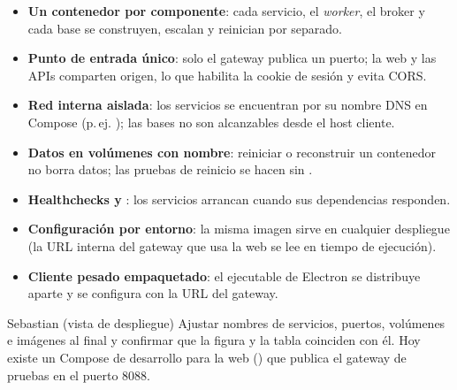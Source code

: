 \begin{itemize}
  \item \textbf{Un contenedor por componente}: cada servicio, el \textit{worker}, el broker y cada base se construyen, escalan y reinician por separado.
  \item \textbf{Punto de entrada único}: solo el gateway publica un puerto; la web y las APIs comparten origen, lo que habilita la cookie de sesión y evita CORS.
  \item \textbf{Red interna aislada}: los servicios se encuentran por su nombre DNS en Compose (p.\,ej. ); las bases no son alcanzables desde el host cliente.
  \item \textbf{Datos en volúmenes con nombre}: reiniciar o reconstruir un contenedor no borra datos; las pruebas de reinicio se hacen sin .
  \item \textbf{Healthchecks y }: los servicios arrancan cuando sus dependencias responden.
  \item \textbf{Configuración por entorno}: la misma imagen sirve en cualquier despliegue (la URL interna del gateway que usa la web se lee en tiempo de ejecución).
  \item \textbf{Cliente pesado empaquetado}: el ejecutable de Electron se distribuye aparte y se configura con la URL del gateway.
\end{itemize}

\begin{pendiente}{Sebastian (vista de despliegue)}
Ajustar nombres de servicios, puertos, volúmenes e imágenes al  final y
confirmar que la figura y la tabla coinciden con él. Hoy existe un Compose de desarrollo para la
web () que publica el gateway de pruebas en el puerto 8088.
\end{pendiente}
